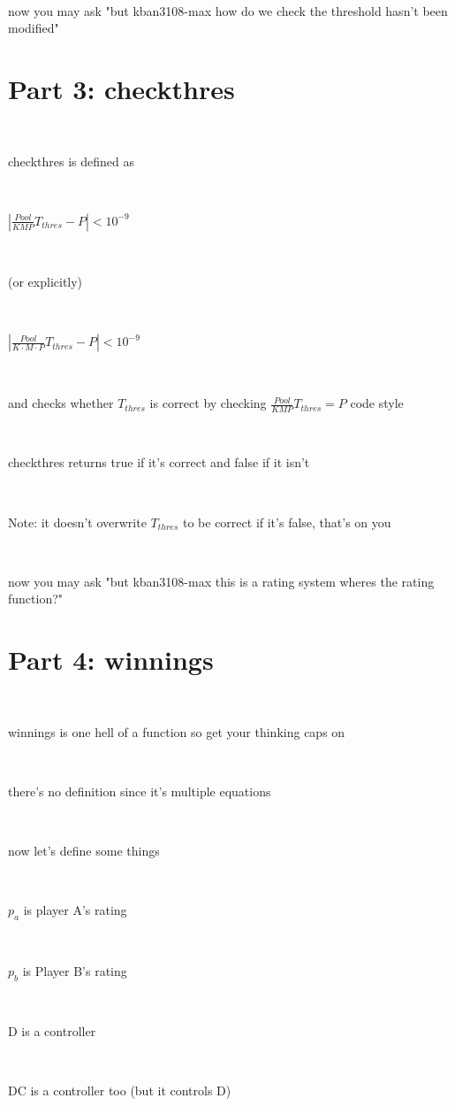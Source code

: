\documentclass{article}
\begin{document}
\ 

now you may ask "but kban3108-max how do we check the threshold hasn't been modified"

\section{Part 3: checkthres}

$ $

checkthres is defined as

\ 

$\left|\frac{Pool}{KMP}T_{thres}-P\right| < 10^{-9}$

\ 

(or explicitly)

\ 

$\left|\frac{Pool}{K \cdot M \cdot P}T_{thres}-P\right| < 10^{-9}$

\ 

and checks whether $T_{thres}$ is correct by checking  $\frac{Pool}{KMP} T_{thres} = P$ code style

\ 

checkthres returns true if it's correct and false if it isn't 

\ 

\colorbox{black!25}{Note: it doesn't overwrite $T_{thres}$ to be correct if it's false, that's on you}

\  

now you may ask "but kban3108-max this is a rating system wheres the rating function?"

\section{Part 4: winnings}

$ $

winnings is one hell of a function so get your thinking caps on

\ 

there's no definition since it's multiple equations 

\ 

now let's define some things

\ 

$p_a$ is player A's rating 

\ 

$p_b$ is Player B's rating

\ 

D is a controller

\ 

DC is a controller too (but it controls D)
\end{document}
